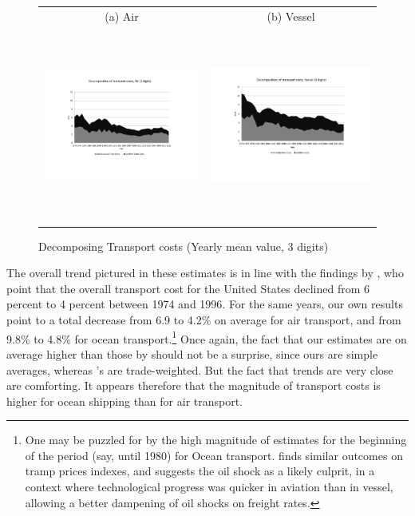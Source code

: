 \documentclass[a4paper,11pt]{article}
\begin{document}
\begin{figure}[htbp]
\caption{Decomposing Transport costs (Yearly mean value, 3 digits)}
\label{fig:decomp_TC_3d}
\begin{center}
\begin{tabular}{cc}
{\small (a) Air } & {\small (b) Vessel}\\
\includegraphics[width=3in, height=2.5in]{Fig2a_decompTC_air_3d.pdf}
& \includegraphics[width=3in,height=2.5in]{Fig2b_decompTC_vessel_3d.pdf} \\
\end{tabular}
\end{center}
\end{figure}


The overall trend pictured in these estimates is in line with the findings by \citet{Hummels_1999}, who point that the overall transport cost for the United States declined from 6 percent to 4 percent between 1974 and 1996. For the same years, our own results point to a total decrease from 6.9 to 4.2\% on average for air transport, and from 9.8\% to 4.8\% for ocean transport.\footnote{One may be puzzled for by the high magnitude of estimates for the beginning of the period (say, until 1980) for Ocean transport. \citet{hummels2007} finds similar outcomes on tramp prices indexes, and suggests the oil shock as a likely culprit, in a context where technological progress was quicker in aviation than in vessel, allowing a better dampening of oil shocks on freight rates.} Once again, the fact that our estimates are on average higher than those by \citet{Hummels_1999} should not be a surprise, since ours are simple averages, whereas \citet{Hummels_1999}'s are trade-weighted. But the fact that trends are very close are comforting. It appears therefore that the magnitude of transport costs is higher for ocean shipping than for air transport.
\end{document}

